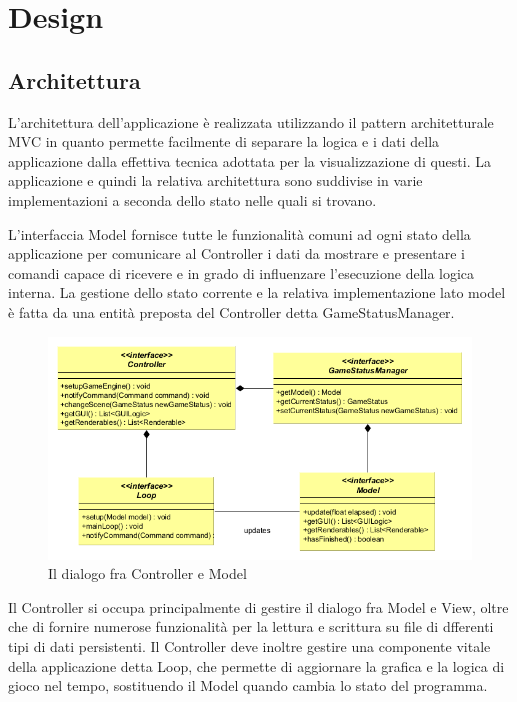\documentclass[a4paper,12pt]{report}
\begin{document}
\chapter{Design}

\section{Architettura}

L'architettura dell'applicazione è realizzata utilizzando il pattern architetturale MVC in quanto permette facilmente di separare la logica e i dati della applicazione dalla effettiva tecnica adottata per la visualizzazione di questi. La applicazione e quindi la relativa architettura sono suddivise in varie implementazioni a seconda dello stato nelle quali si trovano.

L'interfaccia Model fornisce tutte le funzionalità comuni ad ogni stato della applicazione per comunicare al Controller i dati da mostrare e presentare i comandi capace di ricevere e in grado di influenzare l'esecuzione della logica interna. La gestione dello stato corrente e la relativa implementazione lato model è fatta da una entità preposta del Controller detta GameStatusManager. 

\begin{figure}[H]
\centering{}
\includegraphics[width=\linewidth]{img/ArchitetturaControllerModel}
\caption{Il dialogo fra Controller e Model}
\label{img:ControllerModel}
\end{figure}

Il Controller si occupa principalmente di gestire il dialogo fra Model e View, oltre che di fornire numerose funzionalità per la lettura e scrittura su file di dfferenti tipi di dati persistenti. Il Controller deve inoltre gestire una componente vitale della applicazione detta Loop, che permette di aggiornare la grafica e la logica di gioco nel tempo, sostituendo il Model quando cambia lo stato del programma.
\end{document}
